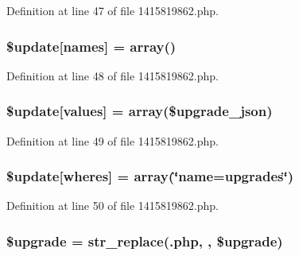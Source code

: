 Definition at line 47 of file 1415819862.\+php.

\subsubsection[{\texorpdfstring{\$update}{$update}}]{\setlength{\rightskip}{0pt plus 5cm}\${\bf update}\mbox{[}\textquotesingle{}names\textquotesingle{}\mbox{]} = array(\textquotesingle{})}\hypertarget{1415819862_8php_abcf5ad2e4fef35de04bef0168cc91ddc}{}\label{1415819862_8php_abcf5ad2e4fef35de04bef0168cc91ddc}


Definition at line 48 of file 1415819862.\+php.

\subsubsection[{\texorpdfstring{\$update}{$update}}]{\setlength{\rightskip}{0pt plus 5cm}\${\bf update}\mbox{[}\textquotesingle{}values\textquotesingle{}\mbox{]} = array(\$upgrade\+\_\+json)}\hypertarget{1415819862_8php_ac82a75b4c6df37380ff77c88f041785e}{}\label{1415819862_8php_ac82a75b4c6df37380ff77c88f041785e}


Definition at line 49 of file 1415819862.\+php.

\subsubsection[{\texorpdfstring{\$update}{$update}}]{\setlength{\rightskip}{0pt plus 5cm}\${\bf update}\mbox{[}\textquotesingle{}wheres\textquotesingle{}\mbox{]} = array(\char`\"{}name=\textquotesingle{}upgrades\textquotesingle{}\char`\"{})}\hypertarget{1415819862_8php_aacde4479a904b32d0f24dea4e01f148c}{}\label{1415819862_8php_aacde4479a904b32d0f24dea4e01f148c}


Definition at line 50 of file 1415819862.\+php.

\subsubsection[{\texorpdfstring{\$upgrade}{$upgrade}}]{\setlength{\rightskip}{0pt plus 5cm}\$upgrade = str\+\_\+replace(\textquotesingle{}.php\textquotesingle{}, \textquotesingle{}\textquotesingle{}, \$upgrade)}\hypertarget{1415819862_8php_a9084097ce600d3cc7a79a20ecaea9906}{}\label{1415819862_8php_a9084097ce600d3cc7a79a20ecaea9906}


